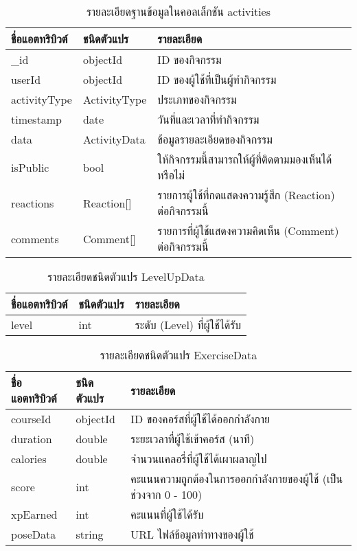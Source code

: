 \begin{table}
    \caption{รายละเอียดฐานข้อมูลในคอลเล็กชัน activities}
    \begin{tabularx}{\textwidth}{ | l | l | X | }
        \hline
        \bf ชื่อแอตทริบิวต์ & \bf ชนิดตัวแปร & \bf รายละเอียด \\\hline
        \_id & objectId & ID ของกิจกรรม\\\hline
        userId & objectId & ID ของผู้ใช้ที่เป็นผู้ทำกิจกรรม\\\hline
        activityType & ActivityType & ประเภทของกิจกรรม\\\hline
        timestamp & date & วันที่และเวลาที่ทำกิจกรรม\\\hline
        data & ActivityData & ข้อมูลรายละเอียดของกิจกรรม\\\hline
        isPublic & bool & ให้กิจกรรมนี้สามารถให้ผู้ที่ติดตามมองเห็นได้หรือไม่\\\hline
        reactions & Reaction[] & รายการผู้ใช้ที่กดแสดงความรู้สึก (Reaction) ต่อกิจกรรมนี้\\\hline
        comments & Comment[] & รายการที่ผู้ใช้แสดงความคิดเห็น (Comment) ต่อกิจกรรมนี้\\\hline
    \end{tabularx}
\end{table}

\begin{table}
    \caption{รายละเอียดชนิดตัวแปร LevelUpData}
    \begin{tabularx}{\textwidth}{ | l | l | X | }
        \hline
        \bf ชื่อแอตทริบิวต์ & \bf ชนิดตัวแปร & \bf รายละเอียด \\\hline
        level & int & ระดับ (Level) ที่ผู้ใช้ได้รับ\\\hline
    \end{tabularx}
\end{table}

\begin{table}
    \caption{รายละเอียดชนิดตัวแปร ExerciseData}
    \begin{tabularx}{\textwidth}{ | l | l | X | }
        \hline
        \bf ชื่อแอตทริบิวต์ & \bf ชนิดตัวแปร & \bf รายละเอียด \\\hline
        courseId & objectId & ID ของคอร์สที่ผู้ใช้ได้ออกกำลังกาย\\\hline
        duration & double & ระยะเวลาที่ผู้ใช้เข้าคอร์ส (นาที)\\\hline
        calories & double & จำนวนแคลอรี่ที่ผู้ใช้ได้เผาผลาญไป\\\hline
        score & int & คะแนนความถูกต้องในการออกกำลังกายของผู้ใช้ (เป็นช่วงจาก 0 - 100)\\\hline
        xpEarned & int & คะแนนที่ผู้ใช้ได้รับ\\\hline
        poseData & string & URL ไฟล์ข้อมูลท่าทางของผู้ใช้\\\hline
    \end{tabularx}
\end{table}

